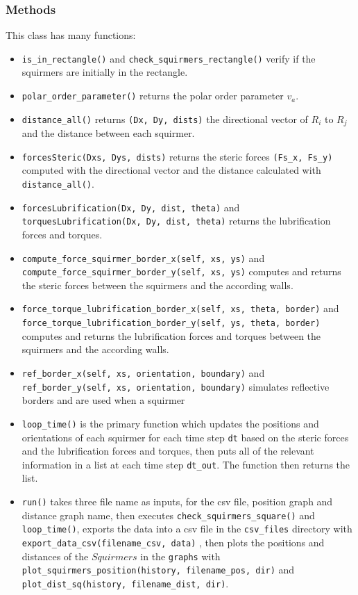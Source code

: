 \documentclass{article}
\begin{document}
\subsubsection*{Methods}
This class has many functions:
\begin{itemize}
   \item \texttt{is\_in\_rectangle()} and \texttt{check\_squirmers\_rectangle()} verify if the squirmers 
    are initially in the rectangle.
   \item \texttt{polar\_order\_parameter()} returns the polar order parameter $v_a$.
   \item \texttt{distance\_all()} returns \texttt{(Dx, Dy, dists)} the directional vector of $R_{i}$ to $R_{j}$ 
   and the distance between each squirmer.
   \item \texttt{forcesSteric(Dxs, Dys, dists)} returns the steric forces \texttt{(Fs\_x, Fs\_y)} computed with the directional vector and the distance calculated with \texttt{distance\_all()}.
   \item \texttt{forcesLubrification(Dx, Dy, dist, theta)} and \texttt{torquesLubrification(Dx, Dy, dist, theta)}
   returns the lubrification forces and torques.
   \item \texttt{compute\_force\_squirmer\_border\_x(self, xs, ys)} and \texttt{compute\_force\_squirmer\_border\_y(self, xs, ys)}
   computes and returns the steric forces between the squirmers and the according walls.
   \item \texttt{force\_torque\_lubrification\_border\_x(self, xs, theta, border)} and \texttt{force\_torque\_lubrification\_border\_y(self, ys, theta, border)}
   computes and returns the lubrification forces and torques between the squirmers and the according walls.
   \item \texttt{ref\_border\_x(self, xs, orientation, boundary)} and \texttt{ref\_border\_y(self, xs, orientation, boundary)} simulates reflective borders
   and are used when a squirmer 
   \item \texttt{loop\_time()} is the primary function which updates the positions and orientations of each squirmer
   for each time step \texttt{dt} based on the steric forces and the lubrification forces and torques, then puts all of the relevant information in a list
   at each time step \texttt{dt\_out}. The function then returns the list.
   \item \texttt{run()} takes three file name as inputs, for the csv file, position graph and distance graph name, 
   then executes \texttt{check\_squirmers\_square()} and \texttt{loop\_time()},
   exports the data into a csv file in the \texttt{csv\_files} directory with \texttt{export\_data\_csv(filename\_csv, data)} 
   , then plots the positions and distances of the $Squirmers$ in the \texttt{graphs} with \texttt{plot\_squirmers\_position(history, filename\_pos, dir)}
   and \texttt{plot\_dist\_sq(history, filename\_dist, dir)}.
\end{itemize}
\end{document}
